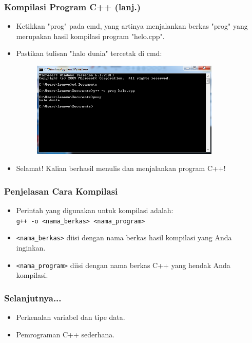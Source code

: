 \begin{frame}
\frametitle{Kompilasi Program C++ (lanj.)}
\begin{itemize}
  \item Ketikkan "prog" pada cmd, yang artinya menjalankan berkas "prog" yang merupakan hasil kompilasi program "helo.cpp".
  \item Pastikan tulisan "halo dunia" tercetak di cmd:
  \begin{figure}
    \includegraphics[width=9cm]{asset/cpp-compile-4.png}
  \end{figure}
  \item Selamat! Kalian berhasil menulis dan menjalankan program C++!
\end{itemize}
\end{frame}

\begin{frame}
\frametitle{Penjelasan Cara Kompilasi}
\begin{itemize}
  \item Perintah yang digunakan untuk kompilasi adalah:\\
  \texttt{g++ -o <nama\_berkas> <nama\_program>}
  \item \texttt{<nama\_berkas>} diisi dengan nama berkas hasil kompilasi yang Anda inginkan.
  \item \texttt{<nama\_program>} diisi dengan nama berkas C++ yang hendak Anda kompilasi.
\end{itemize}
\end{frame}

\begin{frame}
\frametitle{Selanjutnya...}
\begin{itemize}
  \item Perkenalan variabel dan tipe data.
  \item Pemrograman C++ sederhana.
\end{itemize}
\end{frame}


